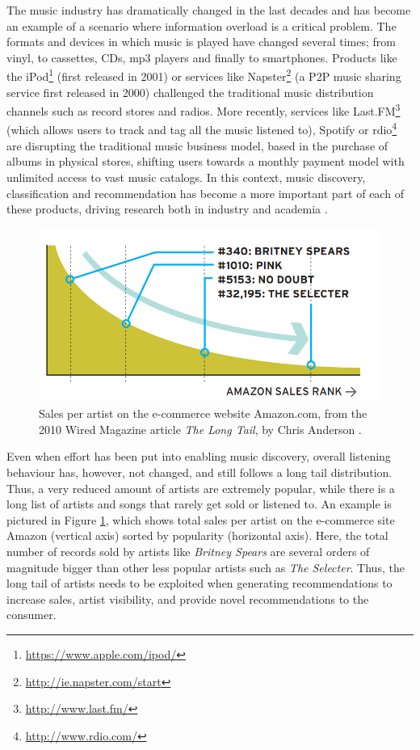 The music industry has dramatically changed in the last decades and has become an example of a scenario where information overload is a critical problem. The formats and devices in which music is played have changed several times;  from vinyl, to cassettes, CDs, mp3 players and finally to smartphones. Products like the iPod\footnote{\url{https://www.apple.com/ipod/}} (first released in 2001) or services like Napster\footnote{\url{http://ie.napster.com/start}} (a P2P music sharing service first released in 2000) challenged the traditional music distribution channels such as record stores and radios. More recently, services like Last.FM\footnote{\url{http://www.last.fm/}} (which allows users to track and tag all the music listened to), Spotify or  rdio\footnote{\url{http://www.rdio.com/}}  are disrupting the traditional music business model, based in the purchase of albums in physical stores, shifting users towards a monthly payment model with unlimited access to vast music catalogs. In this context, music discovery, classification and recommendation has become a more important part of each of these products, driving  research both in industry and academia \cite{Levy2010a, Celma2011, Aman2010, Celma2009}. 

 \begin{figure}[h!]
\centering
\includegraphics[width=1 \textwidth]{figures/top_amazon}
\caption{Sales per artist on the e-commerce website Amazon.com, from the 2010 Wired Magazine article \emph{The Long Tail}, by Chris Anderson \cite{Anderson2004}.}
\label{fig:top_mine}
\end{figure}


Even when effort has been put into enabling music discovery, overall listening behaviour has, however, not changed, and still follows a long tail distribution. Thus, a very reduced amount of artists are extremely popular, while there is a  long list of artists and songs that rarely get sold or listened to. An example is pictured in Figure \ref{fig:top_mine}, which shows total sales per artist on the e-commerce site Amazon (vertical axis) sorted by popularity (horizontal axis). Here, the total number of records sold by artists like \emph{Britney Spears} are several orders of magnitude bigger than other less popular artists such as \emph{The Selecter}. Thus, the long tail of artists needs to be exploited when generating recommendations to increase sales, artist visibility, and provide novel recommendations to the consumer.

